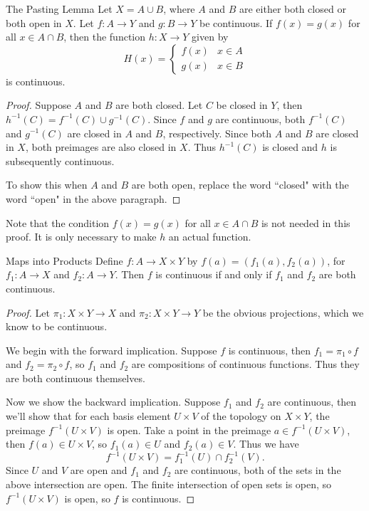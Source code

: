\documentclass[10pt]{report}
\begin{document}
\begin{thrm}{The Pasting Lemma}{}
	Let $X = A \cup B$, where $A$ and $B$ are either both closed or both open in $X$. Let $f:A \to Y$ and $g:B\to Y$ be continuous. If $f(x)=g(x)$ for all $x \in A \cap B$, then the function $h : X \to Y$ given by
	\[
		H(x)=
		\begin{cases}
			f(x) & x \in A \\
			g(x) & x\in B
		\end{cases}
	\] is continuous.
\end{thrm}
\begin{proof}
	Suppose $A$ and $B$ are both closed. Let $C$ be closed in $Y$, then $h^{-1}(C) = f^{-1}(C) \cup g^{-1}(C)$. Since $f$ and $g$ are continuous, both $f^{-1}(C)$ and $g^{-1}(C)$ are closed in $A$ and $B$, respectively. Since both $A$ and $B$ are closed in $X$, both preimages are also closed in $X$. Thus $h^{-1}(C)$ is closed and $h$ is subsequently continuous.

	To show this when $A$ and $B$ are both open, replace the word ``closed" with the word ``open" in the above paragraph.
\end{proof}

	Note that the condition $f(x) = g(x)$ for all $x \in A \cap B$ is not needed in this proof. It is only necessary to make $h$ an actual function.

\begin{thrm}{Maps into Products}{}
	Define $f:A\to X \times Y$ by $f(a)=(f_1(a), f_2(a))$, for $f_1:A\to X$ and $f_2:A\to Y$. Then $f$ is continuous if and only if $f_1$ and $f_2$ are both continuous.
\end{thrm}
\begin{proof}
	Let $\pi_1:X\times Y\to X$ and $\pi_2:X\times Y\to Y$ be the obvious projections, which we know to be continuous.

	We begin with the forward implication. Suppose $f$ is continuous, then $f_1=\pi_1 \circ f$ and $f_2=\pi_2 \circ f$, so $f_1$ and $f_2$ are compositions of continuous functions. Thus they are both continuous themselves.

	Now we show the backward implication. Suppose $f_1$ and $f_2$ are continuous, then we'll show that for each basis element $U \times V$ of the topology on $X \times Y$, the preimage $f^{-1}(U \times V)$ is open. Take a point in the preimage $a \in f^{-1}(U \times V)$, then $f(a) \in U \times V$, so $f_1(a) \in U$ and $f_2(a) \in V$. Thus we have
	\[
		f^{-1}(U \times V) = f_1^{-1}(U) \cap f_2^{-1}(V).
	\] Since $U$ and $V$ are open and $f_1$ and $f_2$ are continuous, both of the sets in the above intersection are open. The finite intersection of open sets is open, so $f^{-1}(U\times V)$ is open, so $f$ is continuous.
\end{proof}
\end{document}
